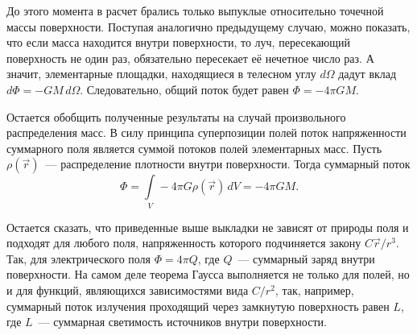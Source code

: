 До этого момента в расчет брались только выпуклые относительно точечной массы поверхности. Поступая аналогично предыдущему случаю, можно показать, что если масса находится внутри поверхности, то луч, пересекающий поверхность не один раз, обязательно пересекает её нечетное число раз. А значит, элементарные площадки, находящиеся в телесном углу $d\Omega$ дадут вклад $d\Phi = - GM \,d \Omega$. Следовательно, общий поток будет равен $\Phi = - 4 \pi GM$.

Остается обобщить полученные результаты на случай произвольного распределения масс. В силу принципа суперпозиции полей поток напряженности суммарного поля является суммой потоков полей элементарных масс. Пусть $\rho(\vec r)$~--- распределение плотности внутри поверхности. Тогда суммарный поток
\begin{equation*}
	\Phi = \int\limits_V -4\pi G \rho(\vec r) \,d V = -4 \pi GM.
\end{equation*}

Остается сказать, что приведенные выше выкладки не зависят от природы поля и подходят для любого поля, напряженность которого подчиняется закону $C\vec{r}/r^3$. Так, для электрического поля $\Phi = 4\pi Q$, где $Q$~--- суммарный заряд внутри поверхности. На самом деле теорема Гаусса выполняется не только для полей, но и для функций, являющихся зависимостями вида $C/r^2$, так, например, суммарный поток излучения проходящий через замкнутую поверхность равен $L$, где $L$~--- суммарная светимость источников внутри поверхности.
